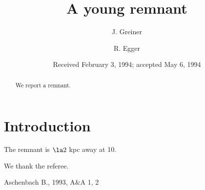 
\title{A young remnant}
\author{J. Greiner \and R. Egger}
\date{Received February 3, 1994; accepted May 6, 1994}
\maketitle
\begin{abstract}
We report a remnant.
\end{abstract}
\section{Introduction}
The remnant is $\la 2$ kpc away at 10\degr.
\begin{acknowledgements}
We thank the referee.
\end{acknowledgements}
\begin{thebibliography}{}
 Aschenbach B., 1993, A\&A 1, 2
\end{thebibliography}

